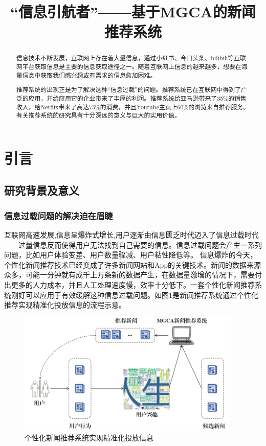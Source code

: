 \documentclass[withoutpreface,bwprint]{cumcmthesis} %
\title{“信息引航者”——基于MGCA的新闻推荐系统}
\begin{document}
	
	\maketitle\thispagestyle{empty}
	\begin{abstract}
		信息技术不断发展，互联网上存在着大量信息，通过小红书、今日头条、bilibili等互联网平台获取信息是主要的信息获取途径之一。随着互联网上信息的越来越多，想要在海量信息中获取我们感兴趣或有需求的信息愈加困难。\par
		推荐系统的出现正是为了解决这种“信息过载”的问题。推荐系统已在互联网中得到了广泛的应用，并给应用它的企业带来了丰厚的利润。推荐系统给亚马逊带来了35\%的销售收入，给Netflix带来了高达75\%的消费，并且Youtube主页上60\%的浏览来自推荐服务。有关推荐系统的研究具有十分深远的意义与巨大的实用价值。\par
		
	\end{abstract}
	\setcounter{page}{1}
	\tableofcontents
	\newpage
	\section{引言}
	\subsection{研究背景及意义}
	\subsubsection{ 信息过载问题的解决迫在眉睫} 
	互联网高速发展,信息呈爆炸式增长,用户逐渐由信息匮乏时代迈入了信息过载时代——过量信息反而使得用户无法找到自己需要的信息。信息过载问题会产生一系列问题，比如用户体验变差、用户数量骤减、用户粘性降低等。
	信息爆炸的今天，个性化新闻推荐技术已经变成了许多新闻网站和App的关键技术。新闻的数据来源众多，可能一分钟就有成千上万条新的数据产生，在数据量激增的情况下，需要付出更多的人力成本，并且人工处理速度慢，效率十分低下。一套个性化新闻推荐系统刚好可以应用于有效缓解这种信息过载问题。如图1是新闻推荐系统通过个性化推荐实现精准化投放信息的流程示意。
	\begin{figure}[H]
		\centering
		\includegraphics[width=0.95\textwidth]{2}
		\caption{个性化新闻推荐系统实现精准化投放信息}
		\label{fig:circuit-diagcam}
	\end{figure}
\end{document}
